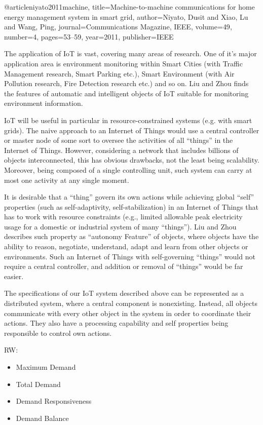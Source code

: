 \documentclass[../main/IoT.tex]{subfiles}
\begin{document}
@article{niyato2011machine,
  title={Machine-to-machine communications for home energy management system in smart grid},
  author={Niyato, Dusit and Xiao, Lu and Wang, Ping},
  journal={Communications Magazine, IEEE},
  volume={49},
  number={4},
  pages={53--59},
  year={2011},
  publisher={IEEE}
}

The application of IoT is vast, covering many areas of research. One of it's major application area is environment monitoring within Smart Cities (with Traffic Management research, Smart Parking etc.), Smart Environment (with Air Pollution research, Fire Detection research etc.) and so on. Liu and Zhou \cite{IoT6150221} finds the features of automatic and intelligent objects of IoT suitable for monitoring environment information.

IoT will be useful in particular in resource-constrained systems (e.g. with smart grids). The naive approach to an Internet of Things would use a central controller or master node of some sort to oversee the activities of all ``things'' in the Internet of Things. However, considering a network that includes billions of objects interconnected, this has obvious drawbacks, not the least being scalability. Moreover, being composed of a single controlling unit, such system can carry at most one activity at any single moment.

It is desirable that a ``thing'' govern its own actions while achieving global ``self'' properties (such as self-adaptivity, self-stabilization) in an Internet of Things that has to work with resource constraints (e.g., limited allowable peak electricity usage for a domestic or industrial system of many ``things''). Liu and Zhou \cite{IoT6150221} describes such property as ``autonomy Feature'' of objects, where objects have the ability to reason, negotiate, understand, adapt and learn from other objects or environments. Such an Internet of Things with self-governing ``things'' would not require a central controller, and addition or removal of ``things'' would be far easier.

The specifications of our IoT system described above can be represented as a distributed system, where a central component is nonexisting. Instead, all objects communicate with every other object in the system in order to coordinate their actions. They also have a processing capability and self properties being responsible to control own actions.

RW:
\begin{itemize}
  \item Maximum Demand
  \item Total Demand
  \item Demand Responsiveness
  \item Demand Balance
\end{itemize}
\end{document}
